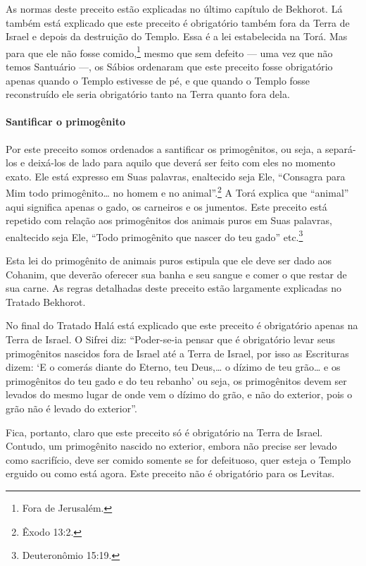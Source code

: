 As normas deste preceito estão explicadas no último capítulo de Bekhorot. Lá também está explicado que este preceito é obrigatório também
fora da Terra de Israel e depois da destruição do Templo. Essa é a lei
estabelecida na Torá. Mas para que ele não fosse comido,\footnote{Fora de Jerusalém.} mesmo
que sem defeito ---
uma vez que não temos Santuário ---, os Sábios ordenaram que este
preceito fosse obrigatório apenas quando o Templo estivesse de pé, e que quando o
Templo fosse reconstruído ele seria obrigatório tanto na Terra quanto
fora dela.

\paragraph{Santificar o primogênito}

Por este preceito somos ordenados a santificar os primogênitos, ou seja,
a separá-los e deixá-los de lado para aquilo que deverá ser feito com
eles no momento exato. Ele está expresso em Suas palavras, enaltecido
seja Ele, ``Consagra para Mim todo primogênito\ldots{} no homem e no
animal''.\footnote{Êxodo 13:2.} A Torá explica que ``animal'' aqui significa
apenas o gado, os carneiros e os jumentos. Este preceito está repetido
com relação aos primogênitos dos animais puros em Suas palavras,
enaltecido seja Ele, ``Todo primogênito que nascer do teu gado'' etc.\footnote{Deuteronômio 15:19.}

Esta lei do primogênito de animais puros estipula que ele deve ser dado
aos Cohanim, que deverão oferecer sua banha e seu sangue e comer
o que restar de sua carne. As regras detalhadas deste preceito estão
largamente explicadas no Tratado Bekhorot.

No final do Tratado Halá está explicado que este preceito é obrigatório
apenas na Terra de Israel. O Sifrei diz: ``Poder-se-ia pensar que é
obrigatório levar seus primogênitos nascidos fora de Israel até a Terra
de Israel, por isso as Escrituras dizem: `E o comerás diante do Eterno,
teu Deus,\ldots{} o dízimo de teu grão\ldots{} e os primogênitos do teu gado e do 
teu rebanho' ou seja, os primogênitos devem ser levados do mesmo lugar
de onde vem o dízimo do grão, e não do exterior, pois o grão não é
levado do exterior''.

Fica, portanto, claro que este preceito só é obrigatório na Terra de
Israel. Contudo, um primogênito nascido no exterior, embora não precise
ser levado como sacrifício, deve ser comido somente se for defeituoso,
quer esteja o Templo erguido ou como está agora. Este preceito não é
obrigatório para os Levitas.

